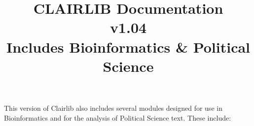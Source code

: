 

\title{\Huge CLAIRLIB Documentation\\ v1.04\\ Includes Bioinformatics \& Political Science}









This version of Clairlib also includes several modules designed for use in
Bioinformatics and for the analysis of Political Science text.  These include:










